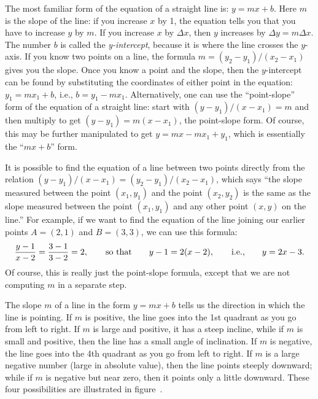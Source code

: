 The most familiar form of the equation of a straight line is:
$y=mx+b$.  Here $m$ is the slope of the line: if you increase $x$ by
1, the equation tells you that you have to increase $y$ by $m$.  If
you increase $x$ by $\Delta x$, then $y$ increases by $\Delta
y=m\Delta x$.  The number $b$ is called the {\it y-intercept}, because
it is where the line crosses the $y$-axis.  If you know two points on
a line, the formula $m=(y_2-y_1)/ (x_2-x_1)$ gives you the slope.
Once you know a point and the slope, then the $y$-intercept can be
found by substituting the coordinates of either point in the equation:
$y_1=mx_1+b$, i.e., $b=y_1-mx_1$.  Alternatively, one can use the
``point-slope'' form of the equation of a straight line: start with
$(y-y_1)/(x-x_1)=m$ and then multiply to get $(y-y_1)=m(x-x_1)$, the
point-slope form. Of course, this may be further manipulated to get
$y=mx-mx_1+y_1$, which is essentially the ``$mx+b$'' form.

It is possible to find the equation of a line between two points directly
from the relation $(y-y_1)/(x-x_1)=(y_2-y_1)/(x_2-x_1)$, which says ``the
slope measured between the point $(x_1,y_1)$ and the point $(x_2,y_2)$ is
the same as the slope measured between the point $(x_1,y_1)$ and any other
point $(x,y)$ on the line.''  For example, if we want to find the equation
of the line joining our earlier points $A=(2,1)$ and $B=(3,3)$, we can use
this formula:
$$
{y-1\over x-2}={3-1\over 3-2}=2,\qquad\hbox{so~that}\qquad
y-1=2(x-2),\qquad\hbox{i.e.,}\qquad y=2x-3.
$$
Of course, this is really just the point-slope formula, except that we
are not computing $m$ in a separate step.

The slope $m$ of a line in the form $y=mx+b$ tells us the
direction in which the line is pointing.  If $m$ is positive, the line goes
into the 1st quadrant as you go from left to right.   If $m$ is large and
positive, it has a steep incline, while if $m$ is small and positive, 
then the line has a small angle of inclination.  If $m$ is negative, the
line goes into the 4th quadrant as you go from left to right.  If $m$ is
a large negative number (large in absolute value), then the line points
steeply downward; while if $m$ is negative but near zero, then it points
only a little downward.  These four possibilities are illustrated in 
figure~.


